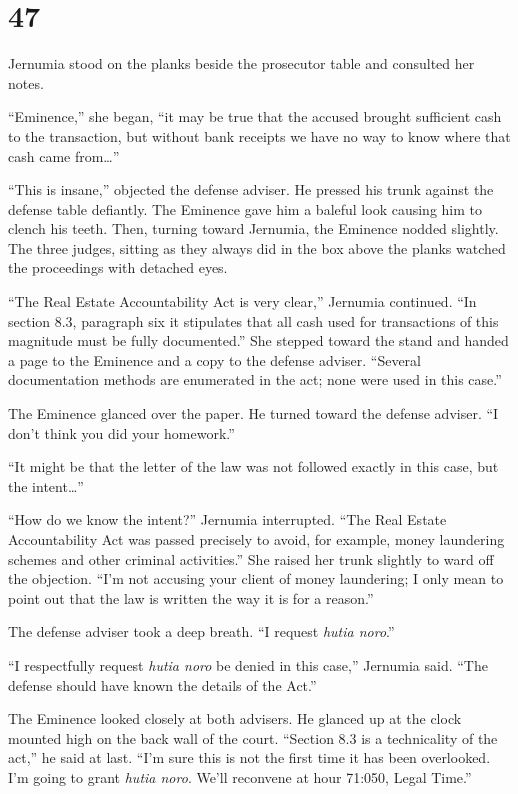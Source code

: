 
\chapter{47}

Jernumia stood on the planks beside the prosecutor table and consulted her notes.

``Eminence,'' she began, ``it may be true that the accused brought sufficient cash to the
transaction, but without bank receipts we have no way to know where that cash came from\ldots''

``This is insane,'' objected the defense adviser. He pressed his trunk against the defense table
defiantly. The Eminence gave him a baleful look causing him to clench his teeth. Then, turning
toward Jernumia, the Eminence nodded slightly. The three judges, sitting as they always did in
the box above the planks watched the proceedings with detached eyes.

``The Real Estate Accountability Act is very clear,'' Jernumia continued. ``In section 8.3,
paragraph six it stipulates that all cash used for transactions of this magnitude must be fully
documented.'' She stepped toward the stand and handed a page to the Eminence and a copy to the
defense adviser. ``Several documentation methods are enumerated in the act; none were used in
this case.''

The Eminence glanced over the paper. He turned toward the defense adviser. ``I don't think you
did your homework.''

``It might be that the letter of the law was not followed exactly in this case, but the
intent\ldots''

``How do we know the intent?'' Jernumia interrupted. ``The Real Estate Accountability Act was
passed precisely to avoid, for example, money laundering schemes and other criminal
activities.'' She raised her trunk slightly to ward off the objection. ``I'm not accusing your
client of money laundering; I only mean to point out that the law is written the way it is for a
reason.''

The defense adviser took a deep breath. ``I request \textit{hutia noro}.''

``I respectfully request \textit{hutia noro} be denied in this case,'' Jernumia said. ``The
defense should have known the details of the Act.''

The Eminence looked closely at both advisers. He glanced up at the clock mounted high on the
back wall of the court. ``Section 8.3 is a technicality of the act,'' he said at last. ``I'm
sure this is not the first time it has been overlooked. I'm going to grant \textit{hutia noro}.
We'll reconvene at hour 71:050, Legal Time.''

